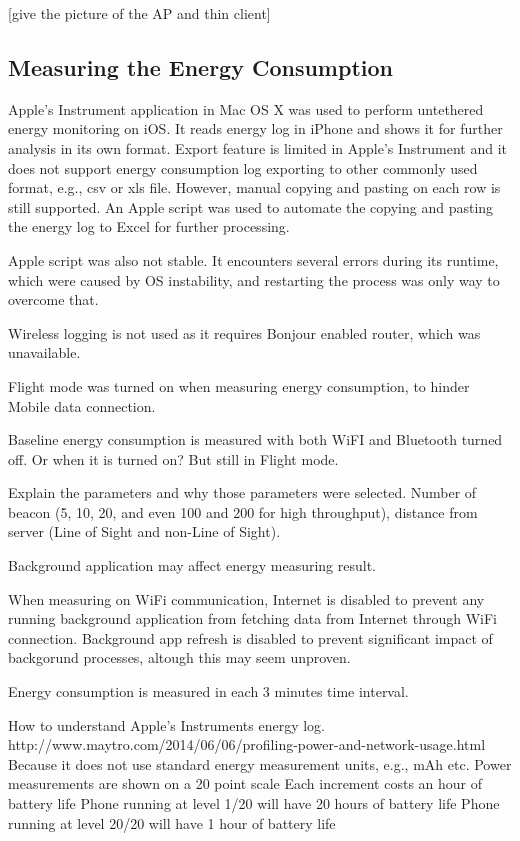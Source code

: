 \documentclass[journal]{vgtc}                %
\begin{document}
[give the picture of the AP and thin client]

\subsection{Measuring the Energy Consumption} %
\label{sub:tracing_}
Apple's Instrument application in Mac OS X was used to perform untethered energy monitoring on iOS. It reads energy log in iPhone and shows it for further analysis in its own format. Export feature is limited in Apple's Instrument and it does not support energy consumption log exporting to other commonly used format, e.g., csv or xls file. However, manual copying and pasting on each row is still supported. An Apple script was used to automate the copying and pasting the energy log to Excel for further processing.

Apple script was also not stable. It encounters several errors during its runtime, which were caused by OS instability, and restarting the process was only way to overcome that.

Wireless logging is not used as it requires Bonjour enabled router, which was unavailable.

Flight mode was turned on when measuring energy consumption, to hinder Mobile data connection.

Baseline energy consumption is measured with both WiFI and Bluetooth turned off.
Or when it is turned on? But still in Flight mode.

Explain the parameters and why those parameters were selected.
Number of beacon (5, 10, 20, and even 100 and 200 for high throughput), distance from server (Line of Sight and non-Line of Sight).

Background application may affect energy measuring result.

When measuring on WiFi communication, Internet is disabled to prevent any running background application from fetching data from Internet through WiFi connection.
Background app refresh is disabled to prevent significant impact of backgorund processes, altough this may seem unproven.

Energy consumption is measured in each 3 minutes time interval.

How to understand Apple's Instruments energy log. http://www.maytro.com/2014/06/06/profiling-power-and-network-usage.html
Because it does not use standard energy measurement units, e.g., mAh etc.
Power measurements are shown on a 20 point scale
Each increment costs an hour of battery life
Phone running at level 1/20 will have 20 hours of battery life
Phone running at level 20/20 will have 1 hour of battery life
\end{document}
